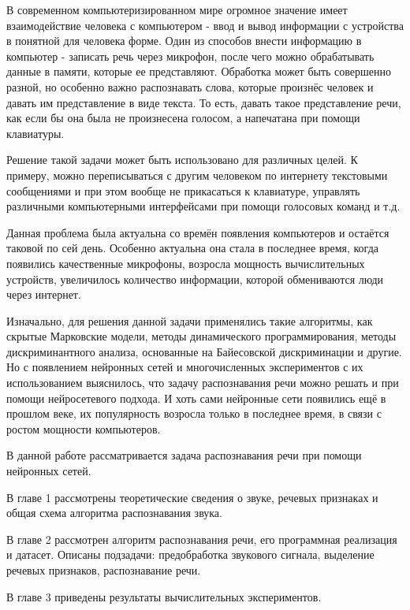 В современном компьютеризированном мире огромное значение имеет взаимодействие человека с компьютером - ввод и вывод информации с устройства в понятной для человека форме. Один из способов внести информацию в компьютер - записать речь через микрофон, после чего можно обрабатывать данные в памяти, которые ее представляют. Обработка может быть совершенно разной, но особенно важно распознавать слова, которые произнёс человек и давать им представление в виде текста. То есть, давать такое представление речи, как если бы она была не произнесена голосом, а напечатана при помощи клавиатуры. 

Решение такой задачи может быть использовано для различных целей. К примеру, можно переписываться с другим человеком по интернету текстовыми сообщениями и при этом вообще не прикасаться к клавиатуре, управлять различными компьютерными интерфейсами при помощи голосовых команд и т.д.

Данная проблема была актуальна со времён появления компьютеров и остаётся таковой по сей день. Особенно актуальна она стала в последнее время, когда появились качественные микрофоны, возросла мощность вычислительных устройств, увеличилось количество информации, которой обмениваются люди через интернет.

Изначально, для решения данной задачи применялись такие алгоритмы, как скрытые Марковские модели, методы динамического программирования, методы дискриминантного анализа, основанные на Байесовской дискриминации и другие. Но с появлением нейронных сетей и многочисленных экспериментов с их использованием выяснилось, что задачу распознавания речи можно решать и при помощи нейросетевого подхода. И хоть сами нейронные сети появились ещё в прошлом веке, их популярность возросла только в последнее время, в связи с ростом мощности компьютеров.

В данной работе рассматривается задача распознавания речи при помощи  нейронных сетей.

В главе 1 рассмотрены теоретические сведения о звуке, речевых признаках и общая схема алгоритма распознавания звука. 
 
В главе 2 рассмотрен алгоритм распознавания речи, его программная реализация и датасет. Описаны подзадачи: предобработка звукового сигнала, выделение речевых признаков, распознавание речи.

В главе 3 приведены результаты вычислительных экспериментов.